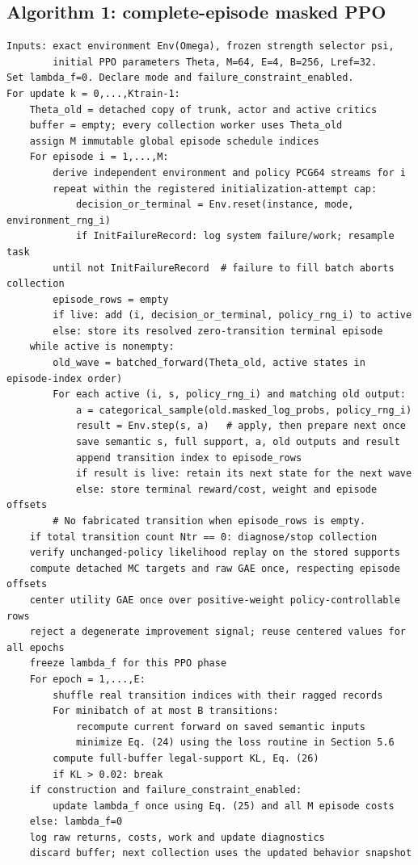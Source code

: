 \documentclass[10pt,a4paper]{article}
\begin{document}

\hypertarget{algorithm-1-complete-episode-masked-ppo}{%
\subsection{Algorithm 1: complete-episode masked
PPO}\label{algorithm-1-complete-episode-masked-ppo}}

\begin{verbatim}
Inputs: exact environment Env(Omega), frozen strength selector psi,
        initial PPO parameters Theta, M=64, E=4, B=256, Lref=32.
Set lambda_f=0. Declare mode and failure_constraint_enabled.
For update k = 0,...,Ktrain-1:
    Theta_old = detached copy of trunk, actor and active critics
    buffer = empty; every collection worker uses Theta_old
    assign M immutable global episode schedule indices
    For episode i = 1,...,M:
        derive independent environment and policy PCG64 streams for i
        repeat within the registered initialization-attempt cap:
            decision_or_terminal = Env.reset(instance, mode, environment_rng_i)
            if InitFailureRecord: log system failure/work; resample task
        until not InitFailureRecord  # failure to fill batch aborts collection
        episode_rows = empty
        if live: add (i, decision_or_terminal, policy_rng_i) to active
        else: store its resolved zero-transition terminal episode
    while active is nonempty:
        old_wave = batched_forward(Theta_old, active states in episode-index order)
        For each active (i, s, policy_rng_i) and matching old output:
            a = categorical_sample(old.masked_log_probs, policy_rng_i)
            result = Env.step(s, a)   # apply, then prepare next once
            save semantic s, full support, a, old outputs and result
            append transition index to episode_rows
            if result is live: retain its next state for the next wave
            else: store terminal reward/cost, weight and episode offsets
        # No fabricated transition when episode_rows is empty.
    if total transition count Ntr == 0: diagnose/stop collection
    verify unchanged-policy likelihood replay on the stored supports
    compute detached MC targets and raw GAE once, respecting episode offsets
    center utility GAE once over positive-weight policy-controllable rows
    reject a degenerate improvement signal; reuse centered values for all epochs
    freeze lambda_f for this PPO phase
    For epoch = 1,...,E:
        shuffle real transition indices with their ragged records
        For minibatch of at most B transitions:
            recompute current forward on saved semantic inputs
            minimize Eq. (24) using the loss routine in Section 5.6
        compute full-buffer legal-support KL, Eq. (26)
        if KL > 0.02: break
    if construction and failure_constraint_enabled:
        update lambda_f once using Eq. (25) and all M episode costs
    else: lambda_f=0
    log raw returns, costs, work and update diagnostics
    discard buffer; next collection uses the updated behavior snapshot
\end{verbatim}
\end{document}

